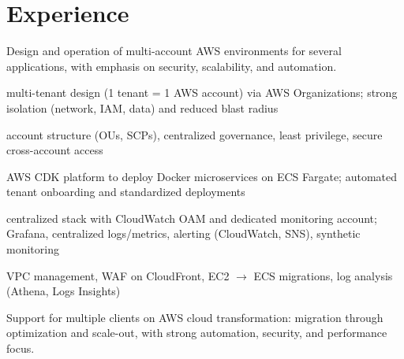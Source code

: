 \section*{Experience}


Design and operation of multi-account AWS environments for several applications, with emphasis on security, scalability, and automation.

\begin{cvitemize}
  \item {} multi-tenant design (1 tenant = 1 AWS account) via AWS Organizations; strong isolation (network, IAM, data) and reduced blast radius
  \item {} account structure (OUs, SCPs), centralized governance, least privilege, secure cross-account access
  \item {} AWS CDK platform to deploy Docker microservices on ECS Fargate; automated tenant onboarding and standardized deployments
  \item {} centralized stack with CloudWatch OAM and dedicated monitoring account; Grafana, centralized logs/metrics, alerting (CloudWatch, SNS), synthetic monitoring
  \item {} VPC management, WAF on CloudFront, EC2 $\rightarrow$ ECS migrations, log analysis (Athena, Logs Insights)
\end{cvitemize}

\cvJobSeparator


Support for multiple clients on AWS cloud transformation: migration through optimization and scale-out, with strong automation, security, and performance focus.

